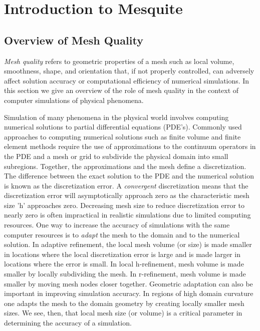 \chapter{Introduction to Mesquite} \label{sec:intro}

\section{Overview of Mesh Quality}

\hskip 0.25in {\it Mesh quality} refers to geometric properties of a mesh such as 
local volume, smoothness, shape, and orientation that, if not properly 
controlled, 
can adversely affect solution accuracy or computational efficiency of numerical simulations. In this section we give an overview of the role of mesh quality 
in the context of computer simulations of physical phenomena. \newline

Simulation of many phenomena in the physical world involves computing 
numerical 
solutions to partial differential equations (PDE's). Commonly used approaches 
to computing  numerical solutions such as finite volume and finite 
element methods require the use of approximations to the continuum operators 
in the PDE and a mesh or grid to subdivide the physical domain into small 
subregions. Together, the approximations and the mesh define a discretization. 
The difference between the exact solution to the PDE and the numerical solution is known as the discretization error. A {\it convergent} 
discretization means that the discretization error will asymptotically 
approach zero as the characteristic mesh size 'h' 
approaches zero. Decreasing mesh size to reduce discretization error to 
nearly zero is often impractical in realistic simulations due to limited 
computing resources. One way to increase the accuracy of simulations with the 
same computer resources is to {\it adapt} the mesh to the domain and to the 
numerical solution. In adaptive refinement, the local mesh volume (or size) 
is made smaller in locations where the local discretization error is large and 
is made larger in locations where the error is small. In local h-refinement, 
mesh volume is made smaller by locally subdividing the mesh. In 
r-refinement, mesh volume is made smaller by moving mesh nodes closer together.
Geometric adaptation can also be important in improving simulation accuracy. In regions of high domain curvature one adapts the mesh to the domain geometry by creating locally smaller mesh sizes. We see, then, that local mesh size (or volume) is a critical parameter in determining the accuracy of a simulation. \newline

